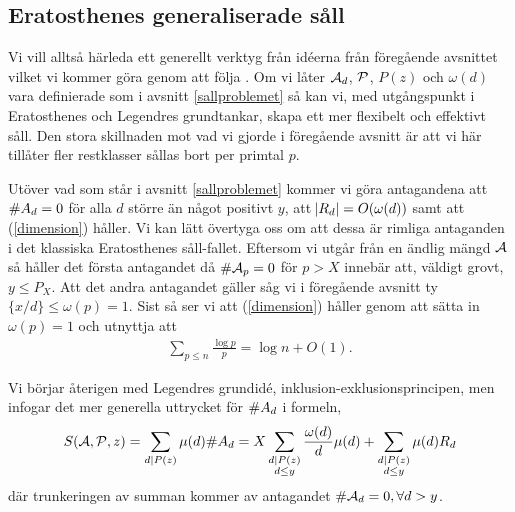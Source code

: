 \subsection{Eratosthenes generaliserade såll} \label{eratosthenes.gen.såll}
Vi vill alltså härleda ett generellt verktyg från idéerna från föregående avsnittet vilket vi kommer göra genom att följa \cite[Kap. 5.4]{cojocarumurty}. Om vi låter $\A_d$, $\P$, $P(z)$ och $\omega(d)$ vara definierade som i avsnitt \ref{sallproblemet} så kan vi, med utgångspunkt i Eratosthenes och Legendres grundtankar, skapa ett mer flexibelt och effektivt såll. Den stora skillnaden mot vad vi gjorde i föregående avsnitt är att vi här tillåter fler restklasser sållas bort per primtal $p$. 

Utöver vad som står i avsnitt \ref{sallproblemet} kommer vi göra antagandena att \(\card{A_d} = 0\) för alla \(d\) större än något positivt $y$, att \(\abs{R_d} = O(\omega(d))\) samt att (\ref{dimension}) håller. Vi kan lätt övertyga oss om att dessa är rimliga antaganden i det klassiska Eratosthenes såll-fallet. Eftersom vi utgår från en ändlig mängd $\A$ så håller det första antagandet då \(\card{\A_p} = 0\) för \(p > X\) innebär att, väldigt grovt, \(y \leq P_{X}\). Att det andra antagandet gäller såg vi i föregående avsnitt ty \(\{x/d\} \leq \omega(p) = 1\). Sist så ser vi att (\ref{dimension}) håller genom att sätta in \(\omega(p) = 1\) och utnyttja att \begin{align} \label{Thm.1.4.4}
    \sum_{p\leq n}\frac{\log p}{p} = \log n + O(1).
\end{align}

Vi börjar återigen med Legendres grundidé, inklusion-exklusionsprincipen, men infogar det mer generella uttrycket för $\card{A_d}$ i formeln,
\begin{align*}
    \S{A}{P}{z} = \sum_{d \divides P(z)} \mu(d) \card{A_d} = X \sum_{\substack{d \divides P(z) \\ d \leq y}} \frac{\omega(d)}{d} \mu(d) + \sum_{\substack{d \divides P(z)  \\ d \leq y}} \mu(d) R_d 
\end{align*}
där trunkeringen av summan kommer av antagandet \(\card{\A_d} = 0, \forall d > y\). 

